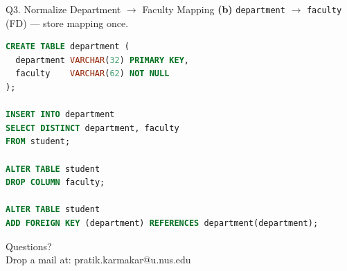 \documentclass{beamer}
\begin{document}
\begin{frame}[fragile]{Q3. Normalize Department \texorpdfstring{$\to$}{->} Faculty Mapping}
\textbf{(b)} \texttt{department} $\to$ \texttt{faculty} (FD) — store mapping once.
\begin{lstlisting}[language=SQL]
CREATE TABLE department (
  department VARCHAR(32) PRIMARY KEY,
  faculty    VARCHAR(62) NOT NULL
);

INSERT INTO department
SELECT DISTINCT department, faculty
FROM student;

ALTER TABLE student
DROP COLUMN faculty;

ALTER TABLE student
ADD FOREIGN KEY (department) REFERENCES department(department);
\end{lstlisting}
\end{frame}

\begin{frame}
\begin{center}
Questions?\\
Drop a mail at: pratik.karmakar@u.nus.edu
\end{center}
\end{frame}
\end{document}

